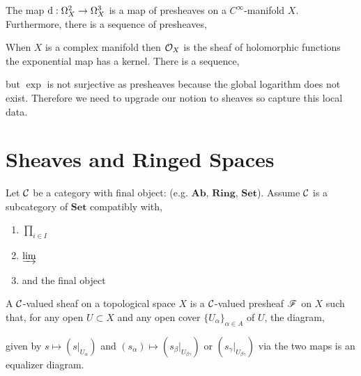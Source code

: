 \documentclass[12pt]{article}
\begin{document}
\begin{example}
The map $\mathrm{d} : \Omega_X^2 \to \Omega_X^3$ is a map of presheaves on a $C^\infty$-manifold $X$. Furthermore, there is a sequence of presheaves,
\begin{center}
\end{center}
When $X$ is a complex manifold then $\mathcal{O}_{X}$ is the sheaf of holomorphic functions the exponential map has a kernel. There is a sequence,
\begin{center}
\end{center}
but $\exp$ is not surjective as presheaves because the global logarithm does not exist. Therefore we need to upgrade our notion to sheaves so capture this local data.
\end{example}

\section{Sheaves and Ringed Spaces}

Let $\mathcal{C}$ be a category with final object: (e.g. $\mathbf{Ab}$, $\mathbf{Ring}$, $\mathbf{Set}$). Assume $\mathcal{C}$ is a subcategory of $\mathbf{Set}$ compatibly with,
\begin{enumerate}
\item $\prod_{i \in I}$
\item $\varinjlim$
\item and the final object
\end{enumerate}

\begin{defn}
A $\mathcal{C}$-valued sheaf on a topological space $X$ is a $\mathcal{C}$-valued presheaf $\mathscr{F}$ on $X$ such that, for any open $U \subset X$ and any open cover $\{ U_\alpha \}_{\alpha \in A}$ of $U$, the diagram,
\begin{center}
\end{center}
given by $s \mapsto (s |_{U_\alpha})$ and $(s_\alpha) \mapsto (s_\beta|_{U_{\beta \gamma}})$ or $(s_\gamma|_{U_{\beta \gamma}})$ via the two maps is an equalizer diagram. 
\end{defn}
\end{document}
